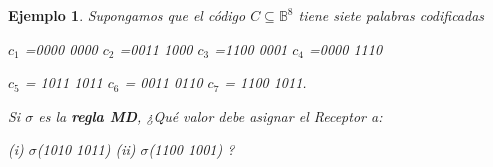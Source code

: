 \documentclass{beamer}
\theoremstyle{plain}
\newtheorem{teorema} [Teorema] {Teorema}
\newtheorem{definicion} [Definicion]{Definición}
\theoremstyle{example}
\theoremstyle{example}
\newtheorem{ejemplo} [Ejemplo] {Ejemplo}
\begin{document}




\begin{frame}  \small  
\begin{ejemplo} 
Supongamos que el código $C \subseteq \mathbb{B}^8$ tiene siete palabras codificadas 

\begin{center}
 $c_1$ =0000 0000 $c_2$ =0011 1000 $c_3$ =1100 0001 $c_4$ =0000 1110
\end{center}
\begin{center}
$c_5$ = 1011 1011	$c_6$ = 0011 0110	$c_7$ = 1100 1011. 
\end{center}

Si $\sigma$ es la \textbf{regla MD}, ¿Qué valor debe asignar el Receptor a:

\begin{center}
(i)	$\sigma$(1010 1011)	(ii)	$\sigma$(1100 1001) ?
\end{center}


\end{ejemplo}

\end{frame} 
\end{document}

